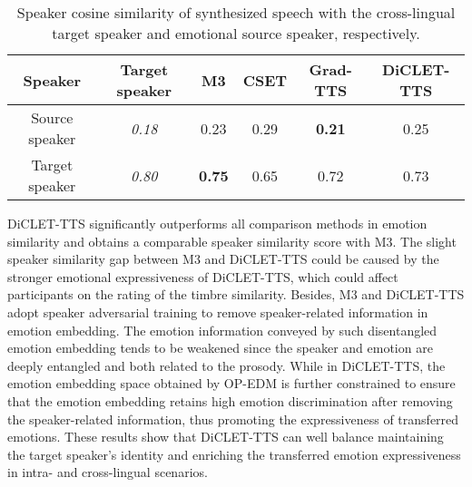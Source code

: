 \documentclass[journal,comsoc]{IEEEtran}
\begin{document}
\begin{table}[t]
 \caption{Speaker cosine similarity of synthesized speech with the cross-lingual target speaker and emotional source speaker, respectively.}
 \label{tab:cosine}
\setlength{\tabcolsep}{1.4mm}
 \centering
\begin{tabular}{c|c|c|c|c|c}
\toprule
\multicolumn{1}{c|}{Speaker} & \multicolumn{1}{c}{Target speaker} & \multicolumn{1}{c}{M3} & \multicolumn{1}{c}{CSET}  & \multicolumn{1}{c}{Grad-TTS} & \multicolumn{1}{c}{DiCLET-TTS} \\ \midrule
    Source speaker &\it{0.18}   &0.23  &0.29  &\bf{0.21}  &0.25 \\\midrule
    Target speaker &\it{0.80}   &\bf{0.75}  &0.65  &0.72  &0.73 \\
  \bottomrule
\end{tabular}
\vspace{-0.1cm}
\end{table}

DiCLET-TTS significantly outperforms all comparison methods in emotion similarity and obtains a comparable speaker similarity score with M3.
The slight speaker similarity gap between M3 and DiCLET-TTS could be caused by the stronger emotional expressiveness of DiCLET-TTS, which could affect participants on the rating of the timbre similarity.
Besides, M3 and DiCLET-TTS adopt speaker adversarial training to remove speaker-related information in emotion embedding. 
The emotion information conveyed by such disentangled emotion embedding tends to be weakened since the speaker and emotion are deeply entangled and both related to the prosody.
While in DiCLET-TTS, the emotion embedding space obtained by OP-EDM is further constrained to ensure that the emotion embedding retains high emotion discrimination after removing the speaker-related information, thus promoting the expressiveness of transferred emotions.
These results show that DiCLET-TTS can well balance maintaining the target speaker's identity and enriching the transferred emotion expressiveness in intra- and cross-lingual scenarios.
\end{document}
